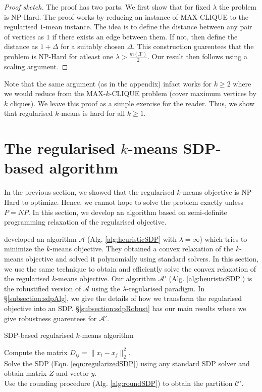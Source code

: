 \documentclass[12pt]{article}
\newcommand{\mc}{\mathcal}
\begin{document}
\begin{proof}[Proof sketch]
The proof has two parts. We first show that for fixed $\lambda$ the problem is NP-Hard. The proof works by reducing an instance of MAX-CLIQUE to the regularised $1$-mean instance. The idea is to define the distance between any pair of vertices as $1$ if there exists an edge between them. If not, then define the distance as $1 + \Delta$ for a suitably chosen $\Delta$. This construction guarentees that the problem is NP-Hard for atleast one $\lambda > \frac{m(\mc X)}{2}$. Our result then follows using a scaling argument.
\end{proof}

Note that the same argument (as in the appendix) infact works for $k \ge 2$ where we would reduce from the MAX-$k$-CLIQUE problem (cover maximum vertices by $k$ cliques). We leave this proof as a simple exercise for the reader. Thus, we show that regularised $k$-means is hard for all $k \ge 1$. 

\section{The regularised $k$-means SDP-based algorithm}
\label{section:heuristic}
In the previous section, we showed that the regularised $k$-means objective is NP-Hard to optimize. Hence, we cannot hope to solve the problem exactly unless $P=NP$. In this section, we develop an algorithm based on semi-definite programming relaxation of the regularised objective. 

\cite{peng2007approximating} developed an algorithm $\mc A$ (Alg. \ref{alg:heuristicSDP} with $\lambda = \infty$) which tries to minimize the $k$-means objective. They obtained a convex relaxation of the $k$-means objective and solved it polynomially using standard solvers. In this section, we use the same technique to obtain and efficiently solve the convex relaxation of the regularised $k$-means objective. Our algorithm $\mc A'$ (Alg. \ref{alg:heuristicSDP}) is the robustified version of $\mc A$ using the $\lambda$-regularised paradigm. In \S \ref{subsection:sdpAlg}, we give the details of how we transform the regularised objective into an SDP. \S \ref{subsection:sdpRobust} has our main results where we give robustness guarentees for $\mc A'$.    

\SetAlgoNoLine
\LinesNumbered
\begin{algorithm}[t]
\caption{SDP-based regularised $k$-means algorithm}
\label{alg:heuristicSDP}
	\Indp\KwIn{ $\mc{X} \subset R^d$, $k$, and hyperparameter $\lambda$.}
	\KwOut{$\mc C' := \{C_1, \ldots, C_k, C_{k+1}$\}.}
	
	Compute the matrix $D_{ij} = \|x_i-x_j\|^2_2$.\\
	Solve the SDP (Eqn. \ref{eqn:regularizedSDP}) using any standard SDP solver and obtain matrix $Z$ and vector $y$.\\
	Use the rounding procedure (Alg. \ref{alg:roundSDP}) to obtain the partition $\mc C'$. 
\end{algorithm}
\end{document}
